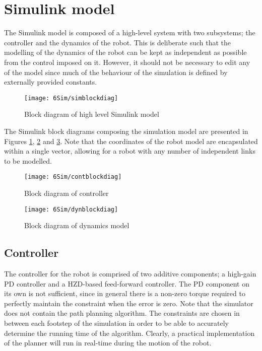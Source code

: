 \section{Simulink model}
The Simulink model is composed of a high-level system with two subsystems; the controller and the dynamics of the robot. This is deliberate such that the modelling of the dynamics of the robot can be kept as independent as possible from the control imposed on it. However, it should not be necessary to edit any of the model since much of the behaviour of the simulation is defined by externally provided constants.

\begin{figure}
	\centering
	\texttt{[image: 6Sim/simblockdiag]}
	\caption{Block diagram of high level Simulink model}
	\label{fig:simblockdiag}
\end{figure}

The Simulink block diagrams composing the simulation model are presented in Figures \ref{fig:simblockdiag}, \ref{fig:contblockdiag} and \ref{fig:dynblockdiag}. Note that the coordinates of the robot model are encapsulated within a single vector, allowing for a robot with any number of independent links to be modelled.

\begin{figure}
	\centering
	\texttt{[image: 6Sim/contblockdiag]}
	\caption{Block diagram of controller}
	\label{fig:contblockdiag}
\end{figure}

\begin{figure}
	\centering
	\texttt{[image: 6Sim/dynblockdiag]}
	\caption{Block diagram of dynamics model}
	\label{fig:dynblockdiag}
\end{figure}

\subsection{Controller}
The controller for the robot is comprised of two additive components; a high-gain PD controller and a HZD-based feed-forward controller. The PD component on its own is not sufficient, since in general there is a non-zero torque required to perfectly maintain the constraint when the error is zero. Note that the simulator does not contain the path planning algorithm. The constraints are chosen in between each footstep of the simulation in order to be able to accurately determine the running time of the algorithm. Clearly, a practical implementation of the planner will run in real-time during the motion of the robot.

